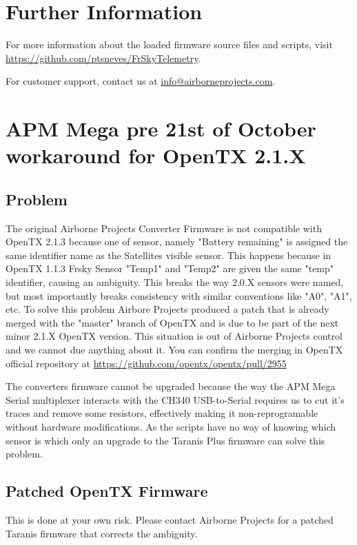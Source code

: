 \documentclass[english]{article}
\begin{document}
\section{Further Information}

For more information about the loaded firmware source files and scripts, visit \url{https://github.com/ptsneves/FrSkyTelemetry}.

For customer support, contact us at \url{info@airborneprojects.com}.

\section{APM Mega pre 21st of October workaround for OpenTX 2.1.X}

\subsection{Problem}

The original Airborne Projects Converter Firmware is not compatible with OpenTX 2.1.3 because one of sensor, namely "Battery remaining" is assigned the same identifier name as the Satellites visible sensor. This happens because in OpenTX 1.1.3 Frsky Sensor "Temp1" and "Temp2" are given the same "temp" identifier, causing an ambiguity. This breaks the way 2.0.X sensors were named, but most importantly breaks consistency with similar conventions like "A0", "A1", etc. To solve this problem Airbore Projects produced a patch that is already merged with the "master" branch of OpenTX and is due to be part of the next minor 2.1.X OpenTX version. This situation is out of Airborne Projects control and we cannot due anything about it. You can confirm the merging in OpenTX official repository at \url{https://github.com/opentx/opentx/pull/2955}

The converters firmware cannot be upgraded because the way the APM Mega Serial multiplexer interacts with the CH340 USB-to-Serial requires us to cut it's traces and remove some resistors, effectively making it non-reprogramable without hardware modifications. As the scripts have no way of knowing which sensor is which only an upgrade to the Taranis Plus firmware can solve this problem.

\subsection{Patched OpenTX Firmware}

This is done at your own risk. Please contact Airborne Projects for a patched Taranis firmware that corrects the ambiguity.
\end{document}
